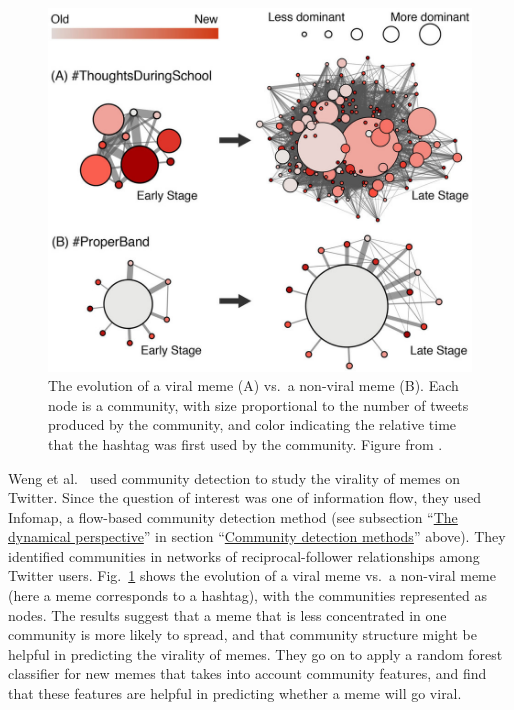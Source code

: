 \begin{figure}
\centering
\includegraphics{img/weng2013_fig4_viraltwitter.jpg}
\caption{The evolution of a viral meme (A) vs.~a non-viral meme (B).
Each node is a community, with size proportional to the number of tweets
produced by the community, and color indicating the relative time that
the hashtag was first used by the community. Figure from
\autocite{weng_virality_2013}.}\label{fig:viraltwitter}
\end{figure}

Weng et al.~\autocite{weng_virality_2013} used community detection to
study the virality of memes on Twitter. Since the question of interest
was one of information flow, they used Infomap, a flow-based community
detection method (see subsection
``\protect\hyperlink{the-dynamical-perspective}{The dynamical
perspective}'' in section
``\protect\hyperlink{community-detection-methods}{Community detection
methods}'' above). They identified communities in networks of
reciprocal-follower relationships among Twitter users.
Fig.~\ref{fig:viraltwitter} shows the evolution of a viral meme vs.~a
non-viral meme (here a meme corresponds to a hashtag), with the
communities represented as nodes. The results suggest that a meme that
is less concentrated in one community is more likely to spread, and that
community structure might be helpful in predicting the virality of
memes. They go on to apply a random forest classifier for new memes that
takes into account community features, and find that these features are
helpful in predicting whether a meme will go viral.

